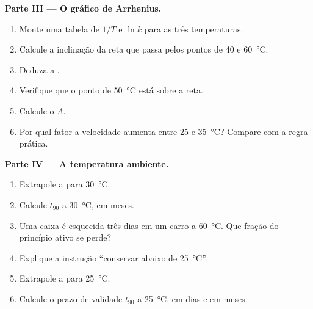 \begin{problem}
\medskip
\noindent\textbf{Parte III --- O gráfico de Arrhenius.}
\begin{enumerate}[resume]
  \item Monte uma tabela de $1/T$ e $\ln k$ para as três temperaturas.
  \item Calcule a inclinação da reta que passa pelos pontos de 40 e
        \qty{60}{\celsius}.
  \item Deduza a .
  \item Verifique que o ponto de \qty{50}{\celsius} está sobre a reta.
  \item Calcule o  $A$.
  \item Por qual fator a velocidade aumenta entre 25 e
        \qty{35}{\celsius}? Compare com a regra prática.
\end{enumerate}

\medskip
\noindent\textbf{Parte IV --- A temperatura ambiente.}
\begin{enumerate}[resume]
  \item Extrapole a  para \qty{30}{\celsius}.
  \item Calcule $t_{90}$ a \qty{30}{\celsius}, em meses.
  \item Uma caixa é esquecida três dias em um carro a \qty{60}{\celsius}.
        Que fração do princípio ativo se perde?
  \item Explique a instrução ``conservar abaixo de \qty{25}{\celsius}''.
  \item Extrapole a  para \qty{25}{\celsius}.
  \item Calcule o prazo de validade $t_{90}$ a \qty{25}{\celsius}, em dias
        e em meses.
\end{enumerate}
\end{problem}
